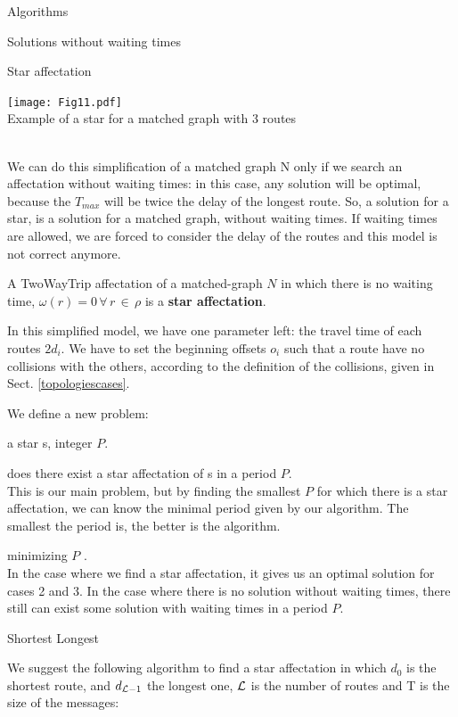 \documentclass[a4paper,10pt]{report}
\begin{document}
\begin{chapter}{Algorithms}
\begin{section}{Solutions without waiting times}
\begin{subsection}{Star affectation}
{{\begin{center}
\texttt{[image: Fig11.pdf]}\\
Example of a star for a matched graph with 3 routes
\end{center}


}}\\


We can do this simplification of a matched graph N only if we search an affectation without waiting times: in this case, any solution
will be optimal, because the $T_{max}$ will be twice the delay of the longest route. So, a solution for a star, is a solution for a matched
graph, without waiting times. If waiting times are allowed, we are forced to consider the delay of the routes and this model is not
correct anymore.

A TwoWayTrip affectation of a matched-graph $N$ in which there is no waiting time, $\omega(r) = 0 \,\forall\, r \,\in\, \rho$ is a {\bf star affectation}.

In this simplified model, we have one parameter left: the travel time of each routes $2d_i$.
We have to set the beginning offsets $o_i$ such that a route have no collisions with the others, 
according to the definition of the collisions, given in Sect. \ref{topologiescases}.


We define a new problem: 



 a star s, integer $P$.

 does there exist a star affectation of s in a period $P$.\\

This is our main problem, but by finding the smallest $P$ for which there is a star affectation, we can know 
the minimal period given by our algorithm. The smallest the period is, the better is the algorithm.


 minimizing $P$ .\\

In the case where we find a star affectation, it gives us an optimal solution for cases 2 and 3.
In the case where there is no solution without waiting times, there still can exist some solution with waiting times in 
a period $P$.
\end{subsection}
\begin{subsection}{Shortest Longest}
 
We suggest the following algorithm to find a star affectation in which $d_0$ is the shortest route, and $d_{{\cal L}-1}$ the longest one, 
${\cal L}$ is the number of routes and T is the size of the messages:


\end{subsection}
\end{section}
\end{chapter}
\end{document}
